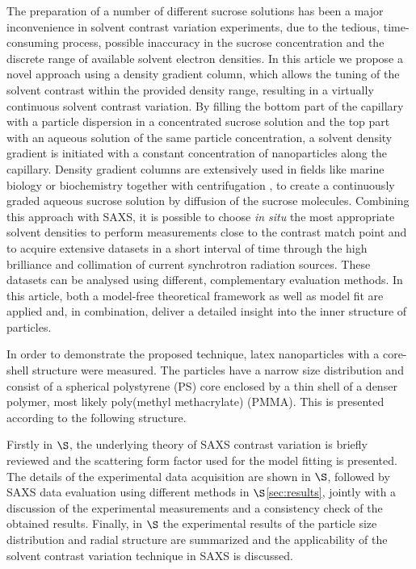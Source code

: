 The preparation of a number of different sucrose solutions has been a major inconvenience in solvent contrast variation experiments, due to the tedious, time-consuming process, possible inaccuracy in the sucrose concentration and the discrete range of available solvent electron densities. In this article we propose a novel approach using a density gradient column, which allows the tuning of the solvent contrast within the provided density range, resulting in a virtually continuous solvent contrast variation. By filling the bottom part of the capillary with a particle dispersion in a concentrated sucrose solution and the top part with an aqueous solution of the same particle concentration, a solvent density gradient is initiated with a constant concentration of nanoparticles along the capillary. Density gradient columns are extensively used in fields like marine biology \citet{coombs_density-gradient_1981} or biochemistry together with centrifugation \citet{hinton_density_1978}, to create a continuously graded aqueous sucrose solution by diffusion of the sucrose molecules. Combining this approach with SAXS, it is possible to choose \emph{in situ} the most appropriate solvent densities to perform measurements close to the contrast match point and to acquire extensive datasets in a short interval of time through the high brilliance and collimation of current synchrotron radiation sources. These datasets can be analysed using different, complementary evaluation methods. In this article, both a model-free theoretical framework as well as model fit are applied and, in combination, deliver a detailed insight into the inner structure of particles. 

In order to demonstrate the proposed technique, latex nanoparticles with a core-shell structure were measured. The particles have a narrow size distribution and consist of a spherical polystyrene (PS) core enclosed by a thin shell of a denser polymer, most likely poly(methyl methacrylate) (PMMA). This is presented according to the following structure. 

Firstly in \(\S\), the underlying theory of SAXS contrast variation is briefly reviewed and the scattering form factor used for the model fitting is presented. The details of the experimental data acquisition are shown in \(\S\), followed by SAXS data evaluation using different methods in \(\S\)\ref{sec:results}, jointly with a discussion of the experimental measurements and a consistency check of the obtained results. Finally, in \(\S\) the experimental results of the particle size distribution and radial structure are summarized and the applicability of the solvent contrast variation technique in SAXS is discussed.
